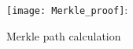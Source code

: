 \begin{figure}[H]
    \centering
    \texttt{[image: Merkle\_proof]}:
    \caption{Merkle path calculation~\cite{smartproperty}}
    \label{fig:Merkleproof}
\end{figure}
